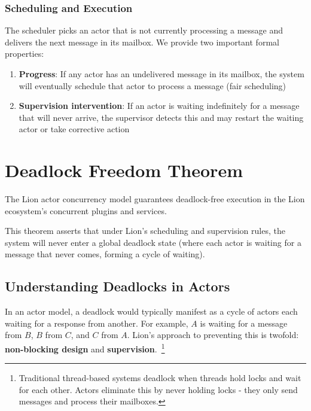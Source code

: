 \subsubsection{Scheduling and Execution}

The scheduler picks an actor that is not currently processing a message and delivers the next message in its mailbox. We provide two important formal properties:

\begin{enumerate}
\item \textbf{Progress}: If any actor has an undelivered message in its mailbox, the system will eventually schedule that actor to process a message (fair scheduling)
\item \textbf{Supervision intervention}: If an actor is waiting indefinitely for a message that will never arrive, the supervisor detects this and may restart the waiting actor or take corrective action
\end{enumerate}

\newpage

\section{Deadlock Freedom Theorem}

\begin{theorem}
The Lion actor concurrency model guarantees deadlock-free execution in the Lion ecosystem's concurrent plugins and services.
\end{theorem}

This theorem asserts that under Lion's scheduling and supervision rules, the system will never enter a global deadlock state (where each actor is waiting for a message that never comes, forming a cycle of waiting).

\subsection{Understanding Deadlocks in Actors}

In an actor model, a deadlock would typically manifest as a cycle of actors each waiting for a response from another. For example, $A$ is waiting for a message from $B$, $B$ from $C$, and $C$ from $A$. Lion's approach to preventing this is twofold: \textbf{non-blocking design} and \textbf{supervision}.~\footnote{Traditional thread-based systems deadlock when threads hold locks and wait for each other. Actors eliminate this by never holding locks - they only send messages and process their mailboxes.}

